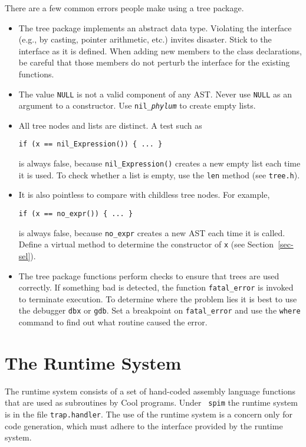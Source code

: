 \documentclass[11pt]{article}
\begin{document}
There are a few common errors people make using a tree package.
\begin{itemize}

\item The tree package implements an abstract data type.  Violating
 the interface (e.g., by casting, pointer arithmetic, etc.)
invites disaster.  Stick to the interface as it is defined.
When adding new members to the class declarations, be careful that
those members do not perturb the interface for the existing functions.

\item The value {\tt NULL} is not a valid component of any AST.
Never use {\tt NULL} as an argument to a constructor.
Use {\tt nil\_{\em phylum}\(\)} to create empty lists.

\item All tree nodes and lists are distinct.  A test such as
\begin{verbatim}
if (x == nil_Expression()) { ... }
\end{verbatim}
is always false, because {\tt nil\_Expression()} creates a new empty list
each time it is used.  To check whether a list is empty, use the
{\tt len} method (see {\tt tree.h}).

\item It is also pointless to compare with childless tree nodes.
For example,
\begin{verbatim}
if (x == no_expr()) { ... }
\end{verbatim}
is always false, because {\tt no\_expr} creates a new AST each time
it is called.  Define a virtual method to determine
the constructor of {\tt x} (see Section~\ref{sec-sel}).

\item The tree package functions perform checks to ensure that trees
are used correctly.  If something bad is detected, the function
{\tt fatal\_error} is invoked to terminate execution.  To determine
where the problem lies it is best to use the debugger {\tt dbx} or {\tt gdb}.  Set a breakpoint on {\tt fatal\_error} and use the
{\tt where} command to find out what routine caused the error.
\end{itemize}

\section{The Runtime System}
\label{sec-runtime}

The runtime system consists of a set of hand-coded assembly language
functions that are used as subroutines by Cool programs.  Under {\tt
spim} the runtime system is in the file {\tt trap.handler}.  The use
of the runtime system is a concern only for code generation, which
must adhere to the interface provided by the runtime system.
\end{document}
